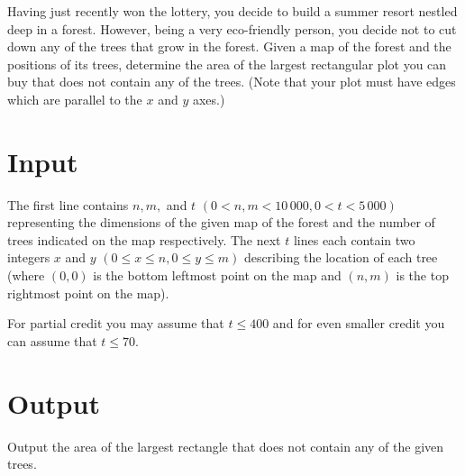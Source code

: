 Having just recently won the lottery, you decide to build a summer resort nestled deep in a forest.
However, being a very eco-friendly person, you decide not to cut down any of the trees that grow in
the forest. Given a map of the forest and the positions of its trees, determine the area of the
largest rectangular plot you can buy that does not contain any of the trees. (Note that your plot
must have edges which are parallel to the $x$ and $y$ axes.)

\section*{Input}
The first line contains $n, m,$ and $t$ $(0 < n, m < 10\,000, 0 < t < 5\,000)$ representing the
dimensions of the given map of the forest and the number of trees indicated on the map respectively.
The next $t$ lines each contain two integers $x$ and $y$ $(0 \le x \le n, 0 \le y \le m)$ describing the
location of each tree (where $(0, 0)$ is the bottom leftmost point on the map and $(n, m)$ is the top
rightmost point on the map).

For partial credit you may assume that $t \le 400$ and for even smaller credit you can assume that
$t \le 70$.

\section*{Output}
Output the area of the largest rectangle that does not contain any of the given trees.
